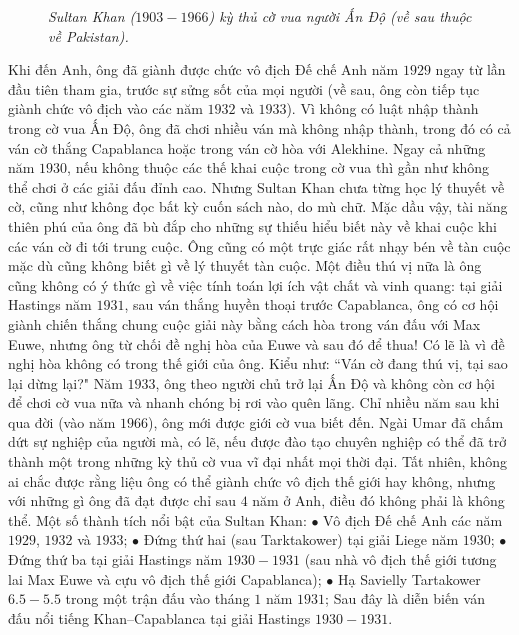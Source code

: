 \begin{multicols}{2}
\begin{figure}[H]
		\caption{\small\textit{\color{gocco}Sultan Khan ($1903-1966$) kỳ thủ cờ vua người Ấn Độ (về sau thuộc về Pakistan).}}
		\vspace*{-10pt}
	\end{figure}
	Khi đến Anh, ông đã giành được chức vô địch Đế chế Anh năm $1929$ ngay từ lần đầu tiên tham gia, trước sự sửng sốt của mọi người (về sau, ông còn tiếp tục giành chức vô địch vào các năm $1932$ và $1933$). Vì không có luật nhập thành trong cờ vua Ấn Độ, ông đã chơi nhiều ván mà không nhập thành, trong đó có cả ván cờ thắng Capablanca hoặc trong ván cờ hòa với Alekhine. Ngay cả những năm $1930$, nếu không thuộc các thế khai cuộc trong cờ vua thì gần như không thể chơi ở các giải đấu đỉnh cao. Nhưng Sultan Khan chưa từng học lý thuyết về cờ, cũng như không đọc bất kỳ cuốn sách nào, do mù chữ. Mặc dầu vậy, tài năng thiên phú của ông đã bù đắp cho những sự thiếu hiểu biết này về khai cuộc khi các ván cờ đi tới trung cuộc. Ông cũng có một trực giác rất nhạy bén về tàn cuộc mặc dù cũng không biết gì về lý thuyết tàn cuộc. Một điều thú vị nữa là ông cũng không có ý thức gì về việc tính toán lợi ích vật chất và vinh quang: tại giải Hastings năm $1931$, sau ván thắng huyền thoại trước Capablanca, ông có cơ hội giành chiến thắng chung cuộc giải này bằng cách hòa trong ván đấu với Max Euwe, nhưng ông từ chối đề nghị hòa của Euwe và sau đó để thua! Có lẽ là vì đề nghị hòa không có trong thế giới của ông. Kiểu như: ``Ván cờ đang thú vị, tại sao lại dừng lại?"
	\vskip 0.1cm
	Năm $1933$, ông theo người chủ trở lại Ấn Độ và không còn cơ hội để chơi cờ vua nữa và nhanh chóng bị rơi vào quên lãng. Chỉ nhiều năm sau khi qua đời (vào năm $1966$), ông mới được giới cờ vua biết đến. Ngài Umar đã chấm dứt sự nghiệp của người mà, có lẽ, nếu được đào tạo chuyên nghiệp có thể đã trở thành một trong những kỳ thủ cờ vua vĩ đại nhất mọi thời đại. Tất nhiên, không ai chắc được rằng liệu ông có thể giành chức vô địch thế giới hay không, nhưng với những gì ông đã đạt được chỉ sau $4$ năm ở Anh, điều đó không phải là không thể. 
	\vskip 0.1cm
	Một số thành tích nổi bật của Sultan Khan:  
	\vskip 0.1cm
	$\bullet$	Vô địch Đế chế Anh các năm $1929$, $1932$ và $1933$;
	\vskip 0.1cm 
	$\bullet$	Đứng thứ hai (sau Tarktakower) tại giải Liege năm $1930$;
	\vskip 0.1cm 
	$\bullet$	Đứng thứ ba tại giải Hastings năm $1930-1931$ (sau nhà vô địch thế giới tương lai Max Euwe và cựu vô địch thế giới Capablanca);
	\vskip 0.1cm
	$\bullet$	Hạ Savielly Tartakower $6{.}5-5{.}5$ trong một trận đấu vào tháng $1$ năm $1931$;
	\vskip 0.1cm
	Sau đây là diễn biến ván đấu nổi tiếng Khan--Capablanca tại giải Hastings $1930-1931$.

\end{multicols}
